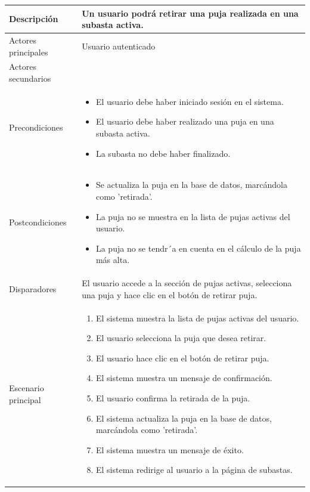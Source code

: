 \begin{longtable}{
    >{\columncolor{lightgreen!20}}p{4cm}
    p{12cm}
    }
    \midrule
    Descripción & Un usuario podrá retirar una puja realizada en una subasta activa. \\
    \midrule
    Actores principales & Usuario autenticado \\
    \midrule
    Actores secundarios &  \\
    \midrule
    Precondiciones & \begin{itemize}[nosep,leftmargin=*]
        \item El usuario debe haber iniciado sesión en el sistema.
        \item El usuario debe haber realizado una puja en una subasta activa.
        \item La subasta no debe haber finalizado.
    \end{itemize} \\
    \midrule
    Postcondiciones & \begin{itemize}[nosep,leftmargin=*]
        \item Se actualiza la puja en la base de datos, marcándola como 'retirada'.
        \item La puja no se muestra en la lista de pujas activas del usuario.
        \item La puja no se tendr´a en cuenta en el cálculo de la puja más alta.
    \end{itemize} \\
    \midrule
    Disparadores & El usuario accede a la sección de pujas activas, selecciona una puja y hace clic en el botón de retirar puja. \\
    \midrule
    Escenario principal & \begin{enumerate}[nosep,leftmargin=*]
        \item El sistema muestra la lista de pujas activas del usuario.
        \item El usuario selecciona la puja que desea retirar.
        \item El usuario hace clic en el botón de retirar puja.
        \item El sistema muestra un mensaje de confirmación.
        \item El usuario confirma la retirada de la puja.
        \item El sistema actualiza la puja en la base de datos, marcándola como 'retirada'.
        \item El sistema muestra un mensaje de éxito.
        \item El sistema redirige al usuario a la página de subastas.
    \end{enumerate} \\

\end{longtable}
